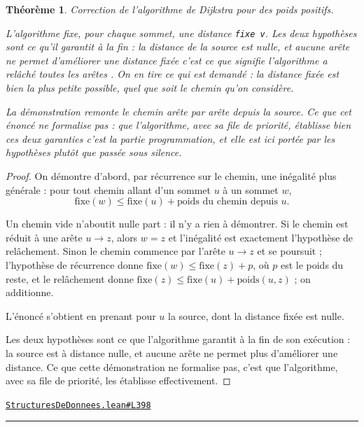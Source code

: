 \documentclass[11pt,a4paper]{article}
\theoremstyle{definition}
\theoremstyle{plain}
\newtheorem{theoreme}{Théorème}
\newcommand{\source}[2]{\par\smallskip\noindent\hfill{\footnotesize\href{#1}{\texttt{#2}}}\par\smallskip}
\begin{document}
\begin{theoreme}
Correction de l'algorithme de Dijkstra pour des poids positifs.

L'algorithme fixe, pour chaque sommet, une distance \texttt{fixe v}. Les deux hypothèses sont
ce qu'il garantit à la fin : la distance de la source est nulle, et aucune arête ne
permet d'améliorer une distance fixée \textemdash{} c'est ce que signifie \og{} l'algorithme a
relâché toutes les arêtes \fg{}. On en tire ce qui est demandé : la distance fixée est
bien la plus petite possible, quel que soit le chemin qu'on considère.

La démonstration remonte le chemin arête par arête depuis la source. Ce que cet
énoncé ne formalise pas : que l'algorithme, avec sa file de priorité, établisse bien
ces deux garanties \textemdash{} c'est la partie programmation, et elle est ici portée par les
hypothèses plutôt que passée sous silence.
\end{theoreme}
\begin{proof}
On démontre d'abord, par récurrence sur le chemin, une inégalité plus générale : pour
tout chemin allant d'un sommet \(u\) à un sommet \(w\),
\[ \mathrm{fixe}(w) \le \mathrm{fixe}(u) + \text{poids du chemin depuis } u . \]

Un chemin vide n'aboutit nulle part : il n'y a rien à démontrer. Si le chemin est réduit
à une arête \(u \to z\), alors \(w = z\) et l'inégalité est exactement l'hypothèse de
relâchement. Sinon le chemin commence par l'arête \(u \to z\) et se poursuit ;
l'hypothèse de récurrence donne \(\mathrm{fixe}(w) \le \mathrm{fixe}(z) + p\), où \(p\)
est le poids du reste, et le relâchement donne
\(\mathrm{fixe}(z) \le \mathrm{fixe}(u) + \mathrm{poids}(u, z)\) ; on additionne.

L'énoncé s'obtient en prenant pour \(u\) la source, dont la distance fixée est nulle.

Les deux hypothèses sont ce que l'algorithme garantit à la fin de son exécution : la
source est à distance nulle, et aucune arête ne permet plus d'améliorer une distance.
Ce que cette démonstration ne formalise pas, c'est que l'algorithme, avec sa file de
priorité, les établisse effectivement.
\end{proof}
\source{https://github.com/Commutator-IO/learn-lean/blob/main/courses/02-lycee/11-informatique-nsi/StructuresDeDonnees.lean\#L398}{StructuresDeDonnees.lean\#L398}

\vfill
\noindent\rule{0.35\linewidth}{0.4pt}\par
{}
\end{document}
